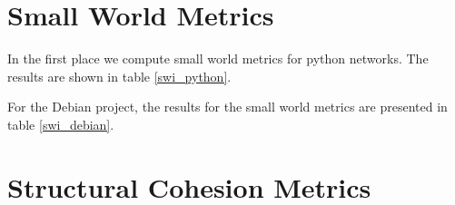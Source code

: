 \section{Small World Metrics}

In the first place we compute small world metrics for python networks. The results are shown in table \ref{swi_python}.



For the Debian project, the results for the small world metrics are presented in table \ref{swi_debian}.




\section{Structural Cohesion Metrics}


